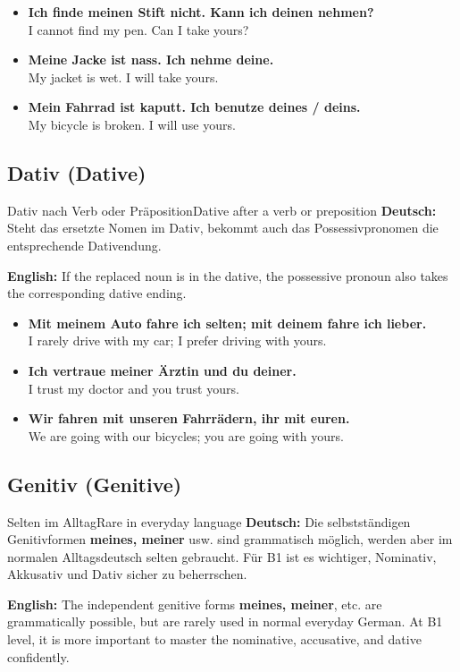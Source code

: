 \documentclass[a4paper,11pt]{article}
\newcommand{\GermanText}[1]{\textbf{Deutsch: }#1\par}
\newcommand{\EnglishText}[1]{{\small\color{SoftGray}\textbf{English: }#1\par}}
\newcommand{\ExampleItem}[2]{\item \textbf{#1}\\{\small\color{SoftGray}#2}}
\begin{document}
            \begin{exbox}
                \begin{itemize}
                    \ExampleItem{Ich finde meinen Stift nicht. Kann ich deinen nehmen?}{I cannot find my pen. Can I take yours?}
                    \ExampleItem{Meine Jacke ist nass. Ich nehme deine.}{My jacket is wet. I will take yours.}
                    \ExampleItem{Mein Fahrrad ist kaputt. Ich benutze deines / deins.}{My bicycle is broken. I will use yours.}
                \end{itemize}
            \end{exbox}

        \subsection{Dativ \textnormal{(Dative)}}

            \begin{grammarentry}{Dativ nach Verb oder Präposition}{Dative after a verb or preposition}
                \GermanText{Steht das ersetzte Nomen im Dativ, bekommt auch das Possessivpronomen die entsprechende Dativendung.}
                \EnglishText{If the replaced noun is in the dative, the possessive pronoun also takes the corresponding dative ending.}
            \end{grammarentry}

            \begin{exbox}
                \begin{itemize}
                    \ExampleItem{Mit meinem Auto fahre ich selten; mit deinem fahre ich lieber.}{I rarely drive with my car; I prefer driving with yours.}
                    \ExampleItem{Ich vertraue meiner Ärztin und du deiner.}{I trust my doctor and you trust yours.}
                    \ExampleItem{Wir fahren mit unseren Fahrrädern, ihr mit euren.}{We are going with our bicycles; you are going with yours.}
                \end{itemize}
            \end{exbox}

        \subsection{Genitiv \textnormal{(Genitive)}}

            \begin{grammarentry}{Selten im Alltag}{Rare in everyday language}
                \GermanText{Die selbstständigen Genitivformen \textbf{meines, meiner} usw. sind grammatisch möglich, werden aber im normalen Alltagsdeutsch selten gebraucht. Für B1 ist es wichtiger, Nominativ, Akkusativ und Dativ sicher zu beherrschen.}
                \EnglishText{The independent genitive forms \textbf{meines, meiner}, etc. are grammatically possible, but are rarely used in normal everyday German. At B1 level, it is more important to master the nominative, accusative, and dative confidently.}
            \end{grammarentry}
\end{document}
